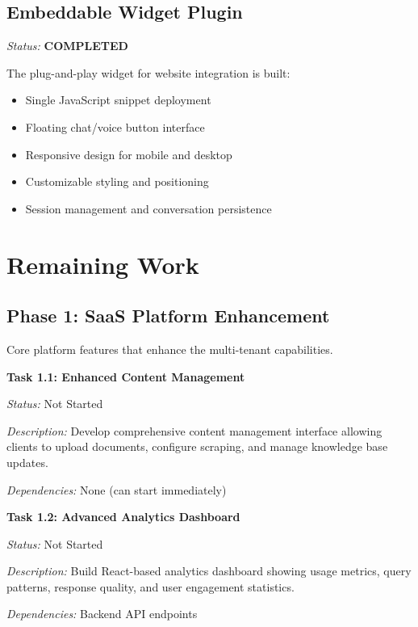 \subsection{Embeddable Widget Plugin}

\textit{Status:} \textbf{\textcolor{accentgreen}{COMPLETED}}

The plug-and-play widget for website integration is built:
\begin{itemize}[leftmargin=*]
    \item Single JavaScript snippet deployment
    \item Floating chat/voice button interface
    \item Responsive design for mobile and desktop
    \item Customizable styling and positioning
    \item Session management and conversation persistence
\end{itemize}

\section{Remaining Work}

\subsection{Phase 1: SaaS Platform Enhancement}

Core platform features that enhance the multi-tenant capabilities.

\vspace{0.3cm}

\textbf{Task 1.1: Enhanced Content Management}

\textit{Status:} Not Started

\textit{Description:} Develop comprehensive content management interface allowing clients to upload documents, configure scraping, and manage knowledge base updates.

\textit{Dependencies:} None (can start immediately)

\vspace{0.3cm}

\textbf{Task 1.2: Advanced Analytics Dashboard}

\textit{Status:} Not Started

\textit{Description:} Build React-based analytics dashboard showing usage metrics, query patterns, response quality, and user engagement statistics.

\textit{Dependencies:} Backend API endpoints


